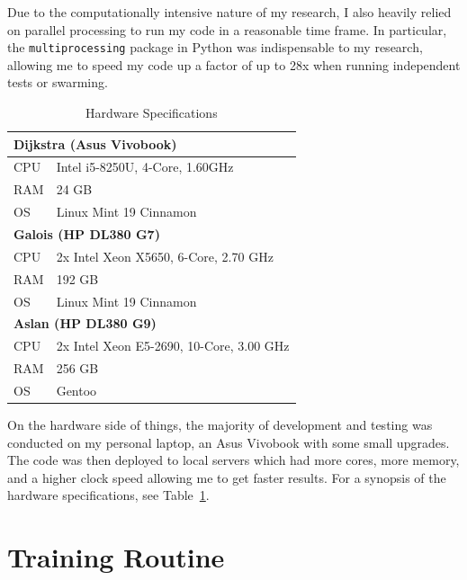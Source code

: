 \documentclass[oneside,12pt,openany]{book}
\begin{document}
	Due to the computationally intensive nature of my research, I also heavily relied on parallel processing to run my code in a reasonable time frame. In particular, the \texttt{multiprocessing} package in Python was indispensable to my research, allowing me to speed my code up a factor of up to 28x when running independent tests or swarming.
	
	\begin{table}[!ht]
		\centering
		\begin{tabular}{|l|l|}
			\hline
			\multicolumn{2}{|l|}{\textbf{Dijkstra (Asus Vivobook)}} \\ \hline
			CPU     & Intel i5-8250U, 4-Core, 1.60GHz     \\ \hline
			RAM     & 24 GB                                \\ \hline
			OS      & Linux Mint 19 Cinnamon               \\ \hline
			\multicolumn{2}{|l|}{\textbf{Galois (HP DL380 G7)}}     \\ \hline
			CPU     &  2x Intel Xeon X5650, 6-Core, 2.70 GHz       \\ \hline
			RAM     & 192 GB                               \\ \hline
			OS      & Linux Mint 19 Cinnamon               \\ \hline
			\multicolumn{2}{|l|}{\textbf{Aslan (HP DL380 G9)}}                         \\ \hline
			CPU&    2x  Intel Xeon E5-2690, 10-Core, 3.00 GHz    \\ \hline
			RAM&    256 GB                                  \\ \hline
			OS&    Gentoo                               \\ \hline
		\end{tabular}
		\caption{Hardware Specifications}
		\label{tab:hardware}
	\end{table}

	On the hardware side of things, the majority of development and testing was conducted on my personal laptop, an Asus Vivobook with some small upgrades. The code was then deployed to local servers which had more cores, more memory, and a higher clock speed allowing me to get faster results. For a synopsis of the hardware specifications, see Table~\ref{tab:hardware}. 
	
	\section{Training Routine}\label{sec:exp:train}
	
\end{document}
